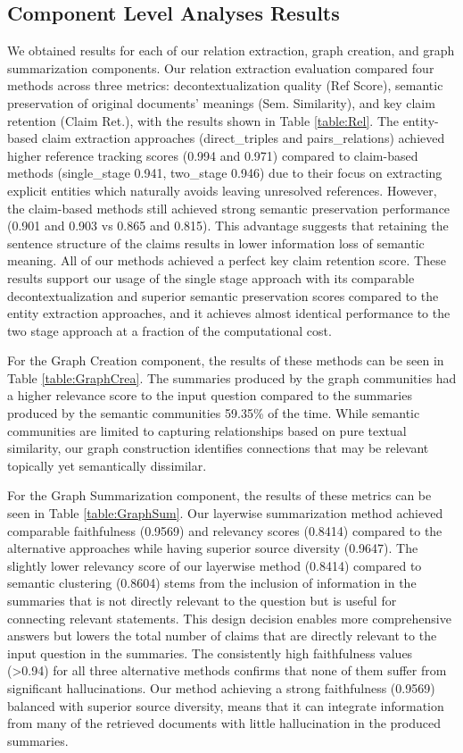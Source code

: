 \documentclass[11pt]{article}
\theoremstyle{definition}
\begin{document}
\subsection{Component Level Analyses Results}
We obtained results for each of our relation extraction, graph creation, and graph summarization components. Our relation extraction evaluation compared four methods across three metrics: decontextualization quality (Ref Score), semantic preservation of original documents' meanings (Sem. Similarity), and key claim retention (Claim Ret.), with the results shown in Table \ref{table:Rel}. The entity-based claim extraction approaches (direct\_triples and pairs\_relations) achieved higher reference tracking scores (0.994 and 0.971) compared to claim-based methods (single\_stage 0.941, two\_stage 0.946) due to their focus on extracting explicit entities which naturally avoids leaving unresolved references. However, the claim-based methods still achieved strong semantic preservation performance (0.901 and 0.903 vs 0.865 and 0.815). This advantage suggests that retaining the sentence structure of the claims results in lower information loss of semantic meaning. All of our methods achieved a perfect key claim retention score. These results support our usage of the single stage approach with its comparable decontextualization and superior semantic preservation scores compared to the entity extraction approaches, and it achieves almost identical performance to the two stage approach at a fraction of the computational cost.

For the Graph Creation component, the results of these methods can be seen in Table \ref{table:GraphCrea}. The summaries produced by the graph communities had a higher relevance score to the input question compared to the summaries produced by the semantic communities 59.35\% of the time. While semantic communities are limited to capturing relationships based on pure textual similarity, our graph construction identifies connections that may be relevant topically yet semantically dissimilar. 

For the Graph Summarization component, the results of these metrics can be seen in Table \ref{table:GraphSum}. Our layerwise summarization method achieved comparable faithfulness (0.9569) and relevancy scores (0.8414) compared to the alternative approaches while having superior source diversity (0.9647). The slightly lower relevancy score of our layerwise method (0.8414) compared to semantic clustering (0.8604) stems from the inclusion of information in the summaries that is not directly relevant to the question but is useful for connecting relevant statements. This design decision enables more comprehensive answers but lowers the total number of claims that are directly relevant to the input question in the summaries. The consistently high faithfulness values (>0.94) for all three alternative methods confirms that none of them suffer from significant hallucinations. Our method achieving a strong faithfulness (0.9569) balanced with superior source diversity, means that it can integrate information from many of the retrieved documents with little hallucination in the produced summaries.
\end{document}
